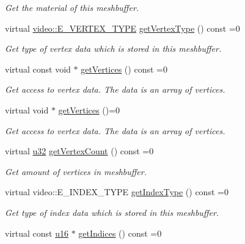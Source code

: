\begin{DoxyCompactItemize}
\begin{DoxyCompactList}\small\item\em Get the material of this meshbuffer. \end{DoxyCompactList}\item 
virtual \hyperlink{namespaceirr_1_1video_a0e3b59e025e0d0db0ed2ee0ce904deac}{video\+::\+E\+\_\+\+V\+E\+R\+T\+E\+X\+\_\+\+T\+Y\+PE} \hyperlink{classirr_1_1scene_1_1IMeshBuffer_a4d7a84ae4416487736f0ed0f519bb4f0}{get\+Vertex\+Type} () const =0
\begin{DoxyCompactList}\small\item\em Get type of vertex data which is stored in this meshbuffer. \end{DoxyCompactList}\item 
virtual const void $\ast$ \hyperlink{classirr_1_1scene_1_1IMeshBuffer_a99891e516246b2cff13b362a435c8028}{get\+Vertices} () const =0
\begin{DoxyCompactList}\small\item\em Get access to vertex data. The data is an array of vertices. \end{DoxyCompactList}\item 
virtual void $\ast$ \hyperlink{classirr_1_1scene_1_1IMeshBuffer_ac1695efc198b05a086487606bc2783e7}{get\+Vertices} ()=0
\begin{DoxyCompactList}\small\item\em Get access to vertex data. The data is an array of vertices. \end{DoxyCompactList}\item 
virtual \hyperlink{namespaceirr_a0416a53257075833e7002efd0a18e804}{u32} \hyperlink{classirr_1_1scene_1_1IMeshBuffer_a77ab285c8c886af8ddeb0371db7bde96}{get\+Vertex\+Count} () const =0
\begin{DoxyCompactList}\small\item\em Get amount of vertices in meshbuffer. \end{DoxyCompactList}\item 
virtual video\+::\+E\+\_\+\+I\+N\+D\+E\+X\+\_\+\+T\+Y\+PE \hyperlink{classirr_1_1scene_1_1IMeshBuffer_a8a993431c2c35420b62a577dc18dbdc2}{get\+Index\+Type} () const =0
\begin{DoxyCompactList}\small\item\em Get type of index data which is stored in this meshbuffer. \end{DoxyCompactList}\item 
virtual const \hyperlink{namespaceirr_ae9f8ec82692ad3b83c21f555bfa70bcc}{u16} $\ast$ \hyperlink{classirr_1_1scene_1_1IMeshBuffer_a76c0013378012af7aeb6cb8f4ea8f9a1}{get\+Indices} () const =0

\end{DoxyCompactItemize}
